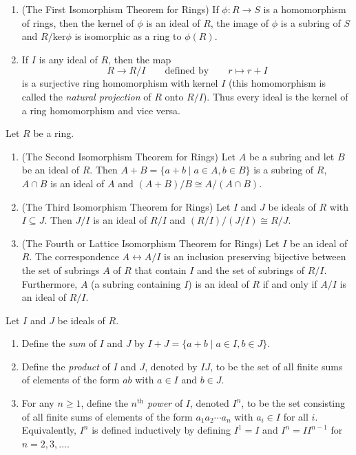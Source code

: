 \documentclass[../main]{subfiles}
\begin{document}
\begin{thm}
 \begin{enumerate}
  \item (The First Isomorphism Theorem for Rings) If $\phi \colon R \to S$ is a homomorphism of rings, then the kernel of $\phi$ is an ideal of $R$, the image of $\phi$ is a subring of $S$ and $R/$ker$\phi$ is isomorphic as a ring to $\phi(R)$.
  
  \item If $I$ is any ideal of $R$, then the map 
  \[ R \to R/I \qquad \text{defined by} \qquad r \mapsto r+I \]
  is a surjective ring homomorphism with kernel $I$ (this homomorphism is called the \textit{natural projection} of $R$ onto $R/I$). Thus every ideal is the kernel of a ring homomorphism and vice versa. 
 \end{enumerate}
\end{thm}


\begin{thm}
 Let $R$ be a ring.
 \begin{enumerate}
  \item (The Second Isomorphism Theorem for Rings) Let $A$ be a subring and let $B$ be an ideal of $R$. Then $A+B = \{a+b \mid a\in A, b\in B \}$ is a subring of $R$, $A \cap B$ is an ideal of $A$ and $(A+B)/B \cong A/(A \cap B)$.
  
  \item (The Third Isomorphism Theorem for Rings) Let $I$ and $J$ be ideals of $R$ with $I \subseteq J$. Then $J/I$ is an ideal of $R/I$ and $(R/I)/(J/I) \cong R/J$.
  
  \item (The Fourth or Lattice Isomorphism Theorem for Rings) Let $I$ be an ideal of $R$. The correspondence $A \leftrightarrow A/I$ is an inclusion preserving bijective between the set of subrings $A$ of $R$ that contain $I$ and the set of subrings of $R/I$. Furthermore, $A$ (a subring containing $I$) is an ideal of $R$ if and only if $A/I$ is an ideal of $R/I$.
 \end{enumerate}
\end{thm}


\begin{dfn}
 Let $I$ and $J$ be ideals of $R$. 
 \begin{enumerate}
  \item Define the \textit{sum} of $I$ and $J$ by $I+J = \{ a+b \mid a\in I, b\in J \}$.
  
  \item Define the \textit{product} of $I$ and $J$, denoted by $IJ$, to be the set of all finite sums of elements of the form $ab$ with $a \in I$ and $b \in J$.
  
  \item For any $n\geq 1$, define the \textit{$n^{\text{th}}$ power} of $I$, denoted $I^n$, to be the set consisting of all finite sums of elements of the form $a_1 a_2 \cdots a_n$ with $a_i \in I$ for all $i$. Equivalently, $I^n$ is defined inductively by defining $I^1 = I$ and $I^n = II^{n-1}$ for $n = 2, 3, \ldots$. 
 \end{enumerate}
\end{dfn}
\end{document}
